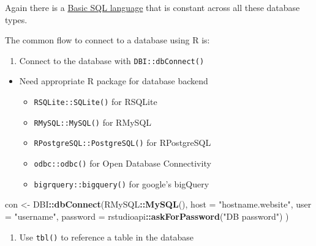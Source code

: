 \documentclass[
]{book}
\newenvironment{Shaded}{\begin{snugshade}}{\end{snugshade}}
\newcommand{\DataTypeTok}[1]{\textcolor[rgb]{0.13,0.29,0.53}{#1}}
\newcommand{\KeywordTok}[1]{\textcolor[rgb]{0.13,0.29,0.53}{\textbf{#1}}}
\newcommand{\NormalTok}[1]{#1}
\newcommand{\OperatorTok}[1]{\textcolor[rgb]{0.81,0.36,0.00}{\textbf{#1}}}
\newcommand{\StringTok}[1]{\textcolor[rgb]{0.31,0.60,0.02}{#1}}
\providecommand{\tightlist}{%
  \setlength{\itemsep}{0pt}\setlength{\parskip}{0pt}}
\theoremstyle{definition}
\theoremstyle{definition}
\theoremstyle{definition}
\theoremstyle{remark}
\begin{document}
Again there is a \href{http://www.sqltutorial.org/sql-cheat-sheet/}{Basic SQL language} that is constant across all these database types.

The common flow to connect to a database using R is:

\begin{enumerate}
\def\labelenumi{\arabic{enumi}.}
\tightlist
\item
  Connect to the database with \texttt{DBI::dbConnect()}\\
\end{enumerate}

\begin{itemize}
\tightlist
\item
  Need appropriate R package for database backend

  \begin{itemize}
  \tightlist
  \item
    \texttt{RSQLite::SQLite()} for RSQLite\\
  \item
    \texttt{RMySQL::MySQL()} for RMySQL\\
  \item
    \texttt{RPostgreSQL::PostgreSQL()} for RPostgreSQL\\
  \item
    \texttt{odbc::odbc()} for Open Database Connectivity\\
  \item
    \texttt{bigrquery::bigquery()} for google's bigQuery
  \end{itemize}
\end{itemize}

\begin{Shaded}
\begin{Highlighting}[]
\NormalTok{con <-}\StringTok{ }\NormalTok{DBI}\OperatorTok{::}\KeywordTok{dbConnect}\NormalTok{(RMySQL}\OperatorTok{::}\KeywordTok{MySQL}\NormalTok{(), }
  \DataTypeTok{host =} \StringTok{"hostname.website"}\NormalTok{,}
  \DataTypeTok{user =} \StringTok{"username"}\NormalTok{,}
  \DataTypeTok{password =}\NormalTok{ rstudioapi}\OperatorTok{::}\KeywordTok{askForPassword}\NormalTok{(}\StringTok{"DB password"}\NormalTok{)}
\NormalTok{)}
\end{Highlighting}
\end{Shaded}

\begin{enumerate}
\def\labelenumi{\arabic{enumi}.}
\setcounter{enumi}{1}
\tightlist
\item
  Use \texttt{tbl()} to reference a table in the database
\end{enumerate}
\end{document}

